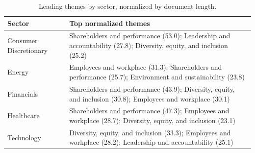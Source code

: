 \begin{table}[htbp]
\centering
\caption{Leading themes by sector, normalized by document length.}
\label{tab:sector_leading_themes}
\begin{tabular}{ll}
\hline
Sector & Top normalized themes \\
\hline
Consumer Discretionary & Shareholders and performance (53.0); Leadership and accountability (27.8); Diversity, equity, and inclusion (25.2) \\
Energy & Employees and workplace (31.3); Shareholders and performance (25.7); Environment and sustainability (23.8) \\
Financials & Shareholders and performance (43.9); Diversity, equity, and inclusion (30.8); Employees and workplace (30.1) \\
Healthcare & Shareholders and performance (47.3); Employees and workplace (28.7); Diversity, equity, and inclusion (23.1) \\
Technology & Diversity, equity, and inclusion (33.3); Employees and workplace (28.2); Leadership and accountability (25.1) \\
\hline
\end{tabular}
\end{table}
